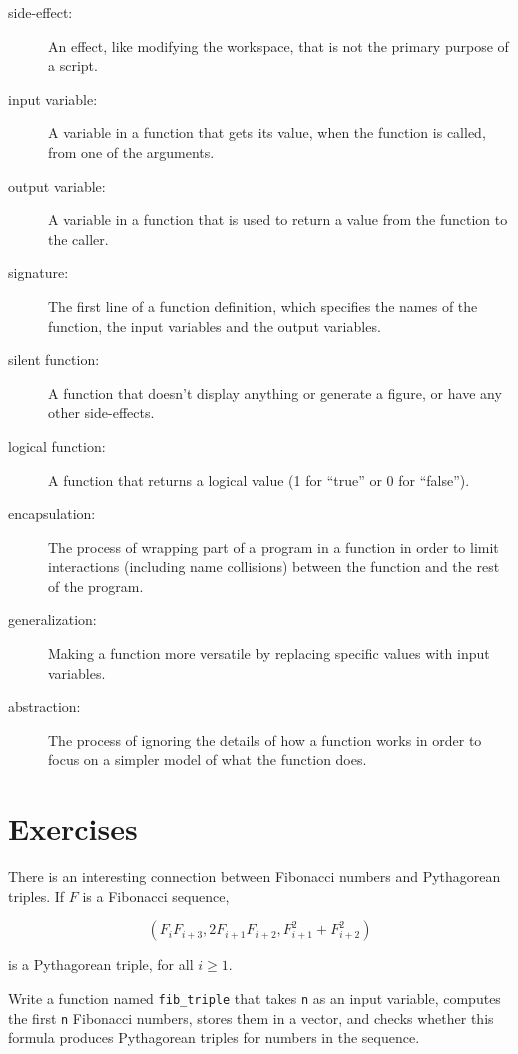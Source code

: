 \begin{description}

\item[side-effect:] An effect, like modifying the workspace, that
is not the primary purpose of a script.

\item[input variable:] A variable in a function that gets its value,
when the function is called, from one of the arguments.

\item[output variable:] A variable in a function that is used to
return a value from the function to the caller.

\item[signature:] The first line of a function definition, which
specifies the names of the function, the input variables and the
output variables.

\item[silent function:] A function that doesn't display anything
or generate a figure, or have any other side-effects.

\item[logical function:] A function that returns a logical value
(1 for ``true'' or 0 for ``false'').

\item[encapsulation:] The process of wrapping part of a program in
a function in order to limit interactions (including name collisions)
between the function and the rest of the program.

\item[generalization:] Making a function more versatile by replacing
specific values with input variables.

\item[abstraction:] The process of ignoring the details of how
a function works in order to focus on a simpler model of what the
function does.

\end{description}


\section{Exercises}

\begin{ex}

There is an interesting connection between Fibonacci numbers and
Pythagorean triples.  If $F$ is a Fibonacci sequence,

\begin{equation}
(F_i F_{i+3}, 2 F_{i+1} F_{i+2}, F_{i+1}^2 + F_{i+2}^2 )
\end{equation}

is a Pythagorean triple, for all $i \ge 1$.

Write a function named {\tt fib\_triple} that
takes {\tt n} as an input variable, computes 
the first {\tt n} Fibonacci numbers, stores them in a vector,
and checks whether this formula produces Pythagorean triples for numbers in the sequence.

\end{ex}


